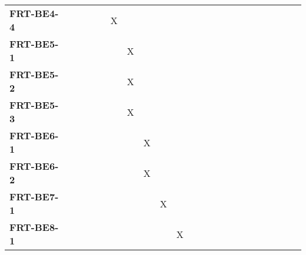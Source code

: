 \documentclass[12pt, titlepage]{article}
\begin{document}
\begin{landscape}
\begin{longtable}{|l|cccccccccccccccc|}
		\textbf{FRT-BE4-4}  & ~                                                         & ~            & ~            & X            & ~            & ~            & ~            & ~            & ~            & ~             & ~             & ~             & ~             & ~             & ~             & ~             \\
		\textbf{FRT-BE5-1}  & ~                                                         & ~            & ~            & ~            & X            & ~            & ~            & ~            & ~            & ~             & ~             & ~             & ~             & ~             & ~             & ~             \\
		\textbf{FRT-BE5-2}  & ~                                                         & ~            & ~            & ~            & X            & ~            & ~            & ~            & ~            & ~             & ~             & ~             & ~             & ~             & ~             & ~             \\
		\textbf{FRT-BE5-3}  & ~                                                         & ~            & ~            & ~            & X            & ~            & ~            & ~            & ~            & ~             & ~             & ~             & ~             & ~             & ~             & ~             \\
		\textbf{FRT-BE6-1}  & ~                                                         & ~            & ~            & ~            & ~            & X            & ~            & ~            & ~            & ~             & ~             & ~             & ~             & ~             & ~             & ~             \\
		\textbf{FRT-BE6-2}  & ~                                                         & ~            & ~            & ~            & ~            & X            & ~            & ~            & ~            & ~             & ~             & ~             & ~             & ~             & ~             & ~             \\
		\textbf{FRT-BE7-1}  & ~                                                         & ~            & ~            & ~            & ~            & ~            & X            & ~            & ~            & ~             & ~             & ~             & ~             & ~             & ~             & ~             \\
		\textbf{FRT-BE8-1}  & ~                                                         & ~            & ~            & ~            & ~            & ~            & ~            & X            & ~            & ~             & ~             & ~             & ~             & ~             & ~             & ~             \\

\end{longtable}
\end{landscape}
\end{document}
